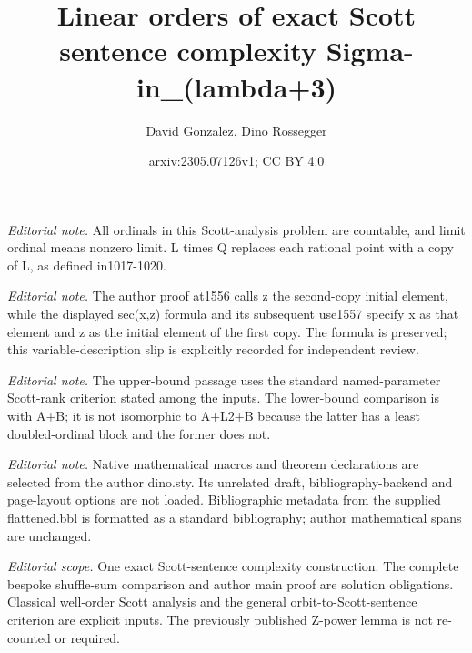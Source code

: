 \documentclass[10pt,a4paper]{amsart}
\title{Linear orders of exact Scott sentence complexity Sigma-in\_(lambda+3)}
\author{David Gonzalez, Dino Rossegger}
\date{arxiv:2305.07126v1; CC BY 4.0}
\begin{document}
\maketitle
\noindent\textit{Editorial note.} All ordinals in this Scott-analysis problem are countable, and limit ordinal means nonzero limit. L times Q replaces each rational point with a copy of L, as defined in1017-1020.\par\medskip
\noindent\textit{Editorial note.} The author proof at1556 calls z the second-copy initial element, while the displayed sec(x,z) formula and its subsequent use1557 specify x as that element and z as the initial element of the first copy. The formula is preserved; this variable-description slip is explicitly recorded for independent review.\par\medskip
\noindent\textit{Editorial note.} The upper-bound passage uses the standard named-parameter Scott-rank criterion stated among the inputs. The lower-bound comparison is with A+B; it is not isomorphic to A+L2+B because the latter has a least doubled-ordinal block and the former does not.\par\medskip
\noindent\textit{Editorial note.} Native mathematical macros and theorem declarations are selected from the author dino.sty. Its unrelated draft, bibliography-backend and page-layout options are not loaded. Bibliographic metadata from the supplied flattened.bbl is formatted as a standard bibliography; author mathematical spans are unchanged.\par\medskip
\noindent\textit{Editorial scope.} One exact Scott-sentence complexity construction. The complete bespoke shuffle-sum comparison and author main proof are solution obligations. Classical well-order Scott analysis and the general orbit-to-Scott-sentence criterion are explicit inputs. The previously published Z-power lemma is not re-counted or required.\par\medskip
\end{document}

